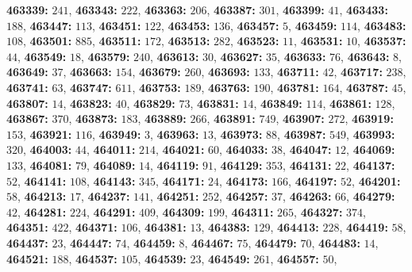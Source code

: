 \textsf{\bfseries 463339:} $241$, \textsf{\bfseries 463343:} $222$, \textsf{\bfseries 463363:} $206$, \textsf{\bfseries 463387:} $301$, \textsf{\bfseries 463399:} $41$, \textsf{\bfseries 463433:} $188$, \textsf{\bfseries 463447:} $113$, \textsf{\bfseries 463451:} $122$, \textsf{\bfseries 463453:} $136$, \textsf{\bfseries 463457:} $5$, \textsf{\bfseries 463459:} $114$, \textsf{\bfseries 463483:} $108$, \textsf{\bfseries 463501:} $885$, \textsf{\bfseries 463511:} $172$, \textsf{\bfseries 463513:} $282$, \textsf{\bfseries 463523:} $11$, \textsf{\bfseries 463531:} $10$, \textsf{\bfseries 463537:} $44$, \textsf{\bfseries 463549:} $18$, \textsf{\bfseries 463579:} $240$, \textsf{\bfseries 463613:} $30$, \textsf{\bfseries 463627:} $35$, \textsf{\bfseries 463633:} $76$, \textsf{\bfseries 463643:} $8$, \textsf{\bfseries 463649:} $37$, \textsf{\bfseries 463663:} $154$, \textsf{\bfseries 463679:} $260$, \textsf{\bfseries 463693:} $133$, \textsf{\bfseries 463711:} $42$, \textsf{\bfseries 463717:} $238$, \textsf{\bfseries 463741:} $63$, \textsf{\bfseries 463747:} $611$, \textsf{\bfseries 463753:} $189$, \textsf{\bfseries 463763:} $190$, \textsf{\bfseries 463781:} $164$, \textsf{\bfseries 463787:} $45$, \textsf{\bfseries 463807:} $14$, \textsf{\bfseries 463823:} $40$, \textsf{\bfseries 463829:} $73$, \textsf{\bfseries 463831:} $14$, \textsf{\bfseries 463849:} $114$, \textsf{\bfseries 463861:} $128$, \textsf{\bfseries 463867:} $370$, \textsf{\bfseries 463873:} $183$, \textsf{\bfseries 463889:} $266$, \textsf{\bfseries 463891:} $749$, \textsf{\bfseries 463907:} $272$, \textsf{\bfseries 463919:} $153$, \textsf{\bfseries 463921:} $116$, \textsf{\bfseries 463949:} $3$, \textsf{\bfseries 463963:} $13$, \textsf{\bfseries 463973:} $88$, \textsf{\bfseries 463987:} $549$, \textsf{\bfseries 463993:} $320$, \textsf{\bfseries 464003:} $44$, \textsf{\bfseries 464011:} $214$, \textsf{\bfseries 464021:} $60$, \textsf{\bfseries 464033:} $38$, \textsf{\bfseries 464047:} $12$, \textsf{\bfseries 464069:} $133$, \textsf{\bfseries 464081:} $79$, \textsf{\bfseries 464089:} $14$, \textsf{\bfseries 464119:} $91$, \textsf{\bfseries 464129:} $353$, \textsf{\bfseries 464131:} $22$, \textsf{\bfseries 464137:} $52$, \textsf{\bfseries 464141:} $108$, \textsf{\bfseries 464143:} $345$, \textsf{\bfseries 464171:} $24$, \textsf{\bfseries 464173:} $166$, \textsf{\bfseries 464197:} $52$, \textsf{\bfseries 464201:} $58$, \textsf{\bfseries 464213:} $17$, \textsf{\bfseries 464237:} $141$, \textsf{\bfseries 464251:} $252$, \textsf{\bfseries 464257:} $37$, \textsf{\bfseries 464263:} $66$, \textsf{\bfseries 464279:} $42$, \textsf{\bfseries 464281:} $224$, \textsf{\bfseries 464291:} $409$, \textsf{\bfseries 464309:} $199$, \textsf{\bfseries 464311:} $265$, \textsf{\bfseries 464327:} $374$, \textsf{\bfseries 464351:} $422$, \textsf{\bfseries 464371:} $106$, \textsf{\bfseries 464381:} $13$, \textsf{\bfseries 464383:} $129$, \textsf{\bfseries 464413:} $228$, \textsf{\bfseries 464419:} $58$, \textsf{\bfseries 464437:} $23$, \textsf{\bfseries 464447:} $74$, \textsf{\bfseries 464459:} $8$, \textsf{\bfseries 464467:} $75$, \textsf{\bfseries 464479:} $70$, \textsf{\bfseries 464483:} $14$, \textsf{\bfseries 464521:} $188$, \textsf{\bfseries 464537:} $105$, \textsf{\bfseries 464539:} $23$, \textsf{\bfseries 464549:} $261$, \textsf{\bfseries 464557:} $50$, 
